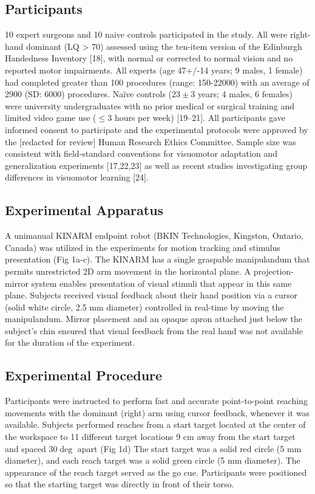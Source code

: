 \documentclass[jou, apacite, 11pt, longtable, floatsintext, notab]{apa6}
\begin{document}
\subsection{Participants}
10 expert surgeons and 10 naive controls participated in the
study. All were right-hand dominant (LQ > 70) assessed using
the ten-item version of the Edinburgh Handedness Inventory
[18], with normal or corrected to normal vision and no
reported motor impairments. All experts (age 47+/-14 years; 9
males, 1 female) had completed greater than 100 procedures
(range: 150-22000) with an average of 2900 (SD: 6000)
procedures. Naïve controls ($23\pm3$ years; 4 males, 6 females)
were university undergraduates with no prior medical or
surgical training and limited video game use ($\leq 3$ hours per
week)
[19–21].
All participants gave informed consent to
participate and the experimental protocols were approved by
the [redacted for review] Human Research Ethics Committee.
Sample size was consistent with field-standard conventions
for visuomotor adaptation and generalization experiments
[17,22,23]
as well as recent studies investigating group
differences in visuomotor learning
[24].

\subsection{Experimental Apparatus}
A unimanual KINARM endpoint robot (BKIN Technologies,
Kingston, Ontario, Canada) was utilized in the experiments
for motion tracking and stimulus presentation (Fig 1a-c).
The KINARM has a single graspable manipulandum that permits
unrestricted 2D arm movement in the horizontal plane. A
projection-mirror system enables presentation of visual
stimuli that appear in this same plane. Subjects received
visual feedback about their hand position via a cursor
(solid white circle, 2.5 mm diameter) controlled in
real-time by moving the manipulandum. Mirror placement and
an opaque apron attached just below the subject’s chin
ensured that visual feedback from the real hand was not
available for the duration of the experiment.

\subsection{Experimental Procedure}
Participants were instructed to perform fast and accurate
point-to-point reaching movements with the dominant (right)
arm using cursor feedback, whenever it was available.
Subjects performed reaches from a start target located at
the center of the workspace to 11 different target locations
9 cm away from the start target and spaced $30\deg$ apart (Fig
1d) The start target was a solid red circle (5 mm diameter),
and each reach target was a solid green circle (5 mm
diameter). The appearance of the reach target served as the
go cue. Participants were positioned so that the starting
target was directly in front of their torso.
\end{document}
